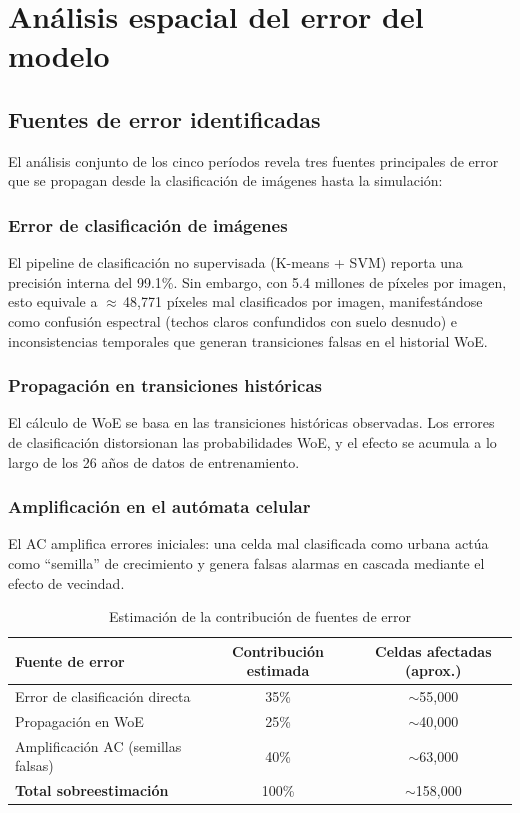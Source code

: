 \section{Análisis espacial del error del modelo}

\subsection{Fuentes de error identificadas}

El análisis conjunto de los cinco períodos revela tres fuentes principales de error que se propagan desde la clasificación de imágenes hasta la simulación:

\subsubsection{Error de clasificación de imágenes}

El pipeline de clasificación no supervisada (K-means + SVM) reporta una precisión interna del 99.1\%. Sin embargo, con 5.4 millones de píxeles por imagen, esto equivale a $\approx$\,48{,}771 píxeles mal clasificados por imagen, manifestándose como confusión espectral (techos claros confundidos con suelo desnudo) e inconsistencias temporales que generan transiciones falsas en el historial WoE.

\subsubsection{Propagación en transiciones históricas}

El cálculo de WoE se basa en las transiciones históricas observadas. Los errores de clasificación distorsionan las probabilidades WoE, y el efecto se acumula a lo largo de los 26 años de datos de entrenamiento.

\subsubsection{Amplificación en el autómata celular}

El AC amplifica errores iniciales: una celda mal clasificada como urbana actúa como ``semilla'' de crecimiento y genera falsas alarmas en cascada mediante el efecto de vecindad.

\begin{table}[htbp]
\centering
\caption{Estimación de la contribución de fuentes de error}
\label{tab:error_contribution}
\begin{tabular}{lcc}
\toprule
\textbf{Fuente de error} & \textbf{Contribución estimada} & \textbf{Celdas afectadas (aprox.)} \\
\midrule
Error de clasificación directa & 35\% & $\sim$55{,}000 \\
Propagación en WoE & 25\% & $\sim$40{,}000 \\
Amplificación AC (semillas falsas) & 40\% & $\sim$63{,}000 \\
\midrule
\textbf{Total sobreestimación} & 100\% & $\sim$158{,}000 \\
\bottomrule
\end{tabular}
\end{table}

